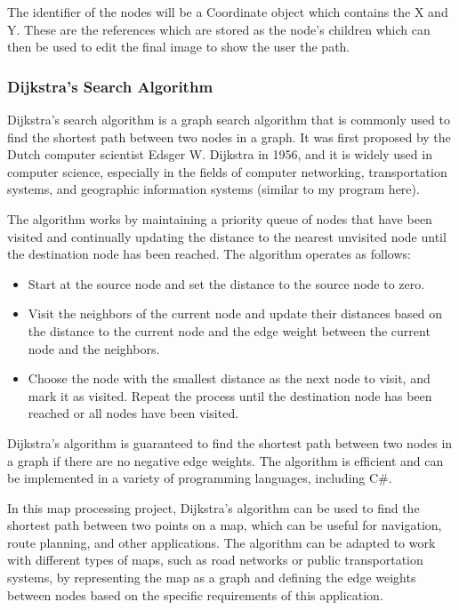 \begin{FlushLeft}
    The identifier of the nodes will be a Coordinate object which contains the X and Y. These are the references which are stored as the node's children which can then be used to edit the final image to show the user the path.
    \bk

    \subsubsection{Dijkstra's Search Algorithm}
    Dijkstra's search algorithm is a graph search algorithm that is commonly used to find the shortest path between two nodes in a graph. It was first proposed by the Dutch computer scientist Edsger W. Dijkstra in 1956, and it is widely used in computer science, especially in the fields of computer networking, transportation systems, and geographic information systems (similar to my program here). \\ \bk

    The algorithm works by maintaining a priority queue of nodes that have been visited and continually updating the distance to the nearest unvisited node until the destination node has been reached. The algorithm operates as follows:\\

    \begin{itemize}
    \item Start at the source node and set the distance to the source node to zero.

    \item Visit the neighbors of the current node and update their distances based on the distance to the current node and the edge weight between the current node and the neighbors.

    \item Choose the node with the smallest distance as the next node to visit, and mark it as visited. Repeat the process until the destination node has been reached or all nodes have been visited.
    \end{itemize}

    Dijkstra's algorithm is guaranteed to find the shortest path between two nodes in a graph if there are no negative edge weights. The algorithm is efficient and can be implemented in a variety of programming languages, including C#.\\ \bk

    In this map processing project, Dijkstra's algorithm can be used to find the shortest path between two points on a map, which can be useful for navigation, route planning, and other applications. The algorithm can be adapted to work with different types of maps, such as road networks or public transportation systems, by representing the map as a graph and defining the edge weights between nodes based on the specific requirements of this application. \\ \bk


\end{FlushLeft}
